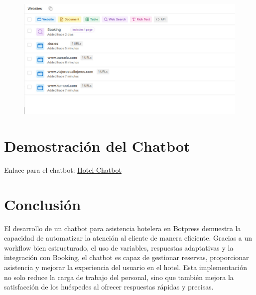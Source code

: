 \documentclass[12pt]{article}
\begin{document}
\begin{figure}[h!]
    \centering
    \includegraphics[width=.6\textwidth]{assets/apiBooking.jpeg}
    \label{fig:my_label}
\end{figure}

\section{Demostración del Chatbot}

Enlace para el chatbot: \href{https://cdn.botpress.cloud/webchat/v2.2/shareable.html?configUrl=https://files.bpcontent.cloud/2025/02/20/18/20250220181209-C0YQTWRL.json}{Hotel-Chatbot}

\clearpage

\section{Conclusión}

El desarrollo de un chatbot para asistencia hotelera en Botpress demuestra la capacidad de automatizar la atención al cliente de manera eficiente. 
Gracias a un workflow bien estructurado, el uso de variables, respuestas adaptativas y la integración con Booking, el chatbot es capaz de gestionar 
reservas, proporcionar asistencia y mejorar la experiencia del usuario en el hotel. Esta implementación no solo reduce la carga de trabajo del personal, 
sino que también mejora la satisfacción de los huéspedes al ofrecer respuestas rápidas y precisas.


\clearpage
\end{document}
